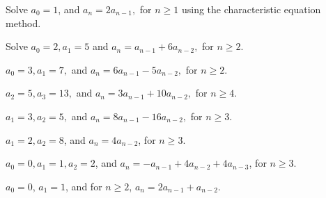 \begin{prob}
Solve $a_0=1$, and $a_n=2a_{n-1},$ for $n\geq 1$ using the characteristic equation method.
\end{prob}

\begin{prob}
Solve $a_0=2, a_1=5$ and $a_n=a_{n-1}+6a_{n-2},$ for $n\geq 2$.
\end{prob}


\begin{prob}
$a_0=3,a_1=7,$ and $a_n=6a_{n-1}-5a_{n-2},$ for $n\geq 2$.

\end{prob}


\begin{prob}
$a_2=5, a_3=13,$ and $a_n=3a_{n-1}+10a_{n-2},$ for $n\geq 4$.
\end{prob}


\begin{prob}
$a_1=3, a_2=5,$ and $a_n=8a_{n-1}-16a_{n-2},$ for $n\geq 3$.
\end{prob}


\begin{prob}
$a_1=2, a_2=8$, and $a_n=4a_{n-2}$, for $n\geq 3$.
\end{prob}


\begin{prob}
$a_0=0, a_1=1, a_2 = 2$, and $a_n=-a_{n-1}+4a_{n-2}+4a_{n-3}$, for $n\geq 3$.
\end{prob}


\begin{prob}
$a_0=0$, $a_1=1$, and
for $n\geq 2$, $a_n=2a_{n-1}+a_{n-2}$.

\end{prob}



